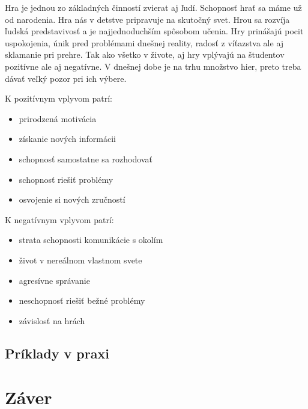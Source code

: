 \documentclass[10pt,twoside,slovak,a4paper]{article}
\begin{document}
Hra je jednou zo základných činností zvierat aj ľudí. Schopnosť hrať sa máme už od narodenia. Hra nás v detstve pripravuje na skutočný svet. Hrou sa rozvíja ľudská predstavivosť a je najjednoduchším spôsobom učenia. Hry prinášajú pocit uspokojenia, únik pred problémami dnešnej reality, radosť z víťazstva ale aj sklamanie pri prehre.  Tak ako všetko v živote, aj hry vplývajú na študentov pozitívne ale aj negatívne. V dnešnej dobe je na trhu množstvo hier, preto treba dávať veľký pozor pri ich výbere.

\vspace{5mm}
K pozitívnym vplyvom patrí: 

\begin{itemize}
\item prirodzená motivácia
\item získanie nových informácii
\item schopnosť samostatne sa rozhodovať
\item schopnosť riešiť problémy
\item osvojenie si nových zručností
\end{itemize}

\vspace{5mm}
K negatívnym vplyvom patrí: 

\begin{itemize}
\item strata schopnosti komunikácie s okolím
\item život v nereálnom vlastnom svete
\item agresívne správanie
\item neschopnosť riešiť bežné problémy
\item závislosť na hrách
\end{itemize}

\subsection{Príklady v praxi} \label{Prax}


\section{Záver}






\end{document}
